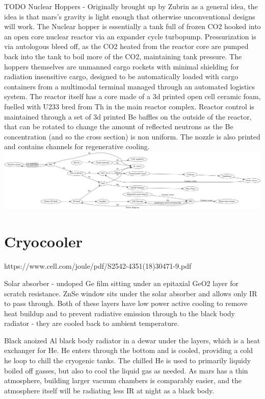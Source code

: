 \documentclass[10pt]{article}
\begin{document}
TODO Nuclear Hoppers - Originally brought up by Zubrin as a general idea, the idea is that mars's gravity is light enough that otherwise unconventional designs will work. The Nuclear hopper is essentially a tank full of frozen CO2 hooked into an open core nuclear reactor via an expander cycle turbopump. Pressurization is via autologous bleed off, as the CO2 heated from the reactor core are pumped back into the tank to boil more of the CO2, maintaining tank pressure. The hoppers themselves are unmanned cargo rockets with minimal shielding for radiation insensitive cargo, designed to be automatically loaded with cargo containers from a multimodal terminal managed through an automated logistics system. The reactor itself has a core made of a 3d printed open cell ceramic foam, fuelled with U233 bred from Th in the main reactor complex. Reactor control is maintained through a set of 3d printed Be baffles on the outside of the reactor, that can be rotated to change the amount of reflected neutrons as the Be concentration (and so the cross section) is non uniform. The nozzle is also printed and contains channels for regenerative cooling.
\includegraphics[width=1\textwidth]{fig_power.png}


\section{Cryocooler}
https://www.cell.com/joule/pdf/S2542-4351(18)30471-9.pdf

Solar absorber - undoped Ge film sitting under an epitaxial GeO2 layer for scratch resistance.
ZnSe window sits under the solar absorber and allows only IR to pass through.
Both of these layers have low power active cooling to remove heat buildup and to prevent radiative emission through to the black body radiator - they are cooled back to ambient temperature.

Black anoized Al black body radiator in a dewar under the layers, which is a heat exchanger for He. He enters through the bottom and is cooled, providing a cold he loop to chill the cryogenic tanks. The chilled He is used to primarily liquidy boiled off gasses, but also to cool the liquid gas as needed. As mars has a thin atmosphere, building larger vacuum chambers is comparably easier, and the atmosphere itself will be radiating less IR at night as a black body.
\end{document}
